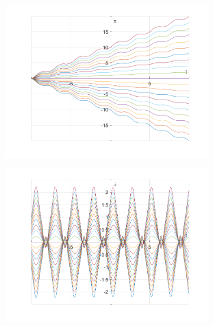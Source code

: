 \documentclass{article}
\begin{document}
	\begin{figure}[h!]
		\centering
		\begin{subfigure}[b]{0.48\linewidth}
			\includegraphics[width=\linewidth]{./SmallOscillations/S4/F3.png}
		\end{subfigure}
		\begin{subfigure}[b]{0.48\linewidth}
			\includegraphics[width=\linewidth]{./SmallOscillations/S4/F4.png}
		\end{subfigure}
	\end{figure}
	
\end{document}
